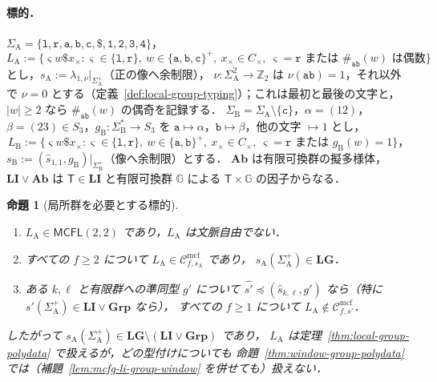 \documentclass[11pt,a4paper]{ltjsarticle}
\numberwithin{equation}{section}
\theoremstyle{plain}
\newtheorem{proposition}[theorem]{命題}
\theoremstyle{definition}
\theoremstyle{remark}
\newcommand{\Cmcf}[2]{\mathcal{C}^{\mathrm{mcf}}_{#1,#2}}
\theoremstyle{plain}
\begin{document}
\paragraph{標的．}
$\Sigma_{\mathrm A}=\{\mathtt l,\mathtt r,\mathtt a,\mathtt b,\mathtt c,\mathtt\$,
\mathtt 1,\mathtt 2,\mathtt 3,\mathtt 4\}$，
\[
 L_{\mathrm A}:=\{\varsigma w\mathtt\$x_\times:\varsigma\in\{\mathtt l,\mathtt r\},\
 w\in\{\mathtt a,\mathtt b,\mathtt c\}^+,\ x_\times\in C_\times,\
 \varsigma=\mathtt r\text{ または }\#_{\mathtt{ab}}(w)\text{ は偶数}\}
\]
とし，$s_{\mathrm A}:=\lambda_{1,\nu}|_{\Sigma_{\mathrm A}^+}$（正の像へ余制限），
$\nu:\Sigma_{\mathrm A}^2\to\mathbb Z_2$ は $\nu(\mathtt{ab})=1$，それ以外で $\nu=0$
とする（定義~\ref{def:local-group-typing}）；これは最初と最後の文字と，
$|w|\ge2$ なら $\#_{\mathtt{ab}}(w)$ の偶奇を記録する．
$\Sigma_{\mathrm B}=\Sigma_{\mathrm A}\setminus\{\mathtt c\}$，$\alpha=(12)$，
$\beta=(23)\in S_3$，$g_{\mathrm B}:\Sigma_{\mathrm B}^*\to S_3$ を
$\mathtt a\mapsto\alpha$，$\mathtt b\mapsto\beta$，他の文字 $\mapsto1$ とし，
\[
 L_{\mathrm B}:=\{\varsigma w\mathtt\$x_\times:\varsigma\in\{\mathtt l,\mathtt r\},\
 w\in\{\mathtt a,\mathtt b\}^+,\ x_\times\in C_\times,\
 \varsigma=\mathtt r\text{ または }g_{\mathrm B}(w)=1\}，
\]
$s_{\mathrm B}:=(\widehat s_{1,1},g_{\mathrm B})|_{\Sigma_{\mathrm B}^+}$（像へ余制限）とする．
$\mathbf{Ab}$ は有限可換群の擬多様体，
$\mathbf{LI}\vee\mathbf{Ab}$ は $\mathsf T\in\mathbf{LI}$ と有限可換群 ${\mathbb G}$ による
$\mathsf T\times {\mathbb G}$ の因子からなる．

\begin{proposition}[局所群を必要とする標的]
\label{prop:lg-needed-target}
\begin{enumerate}[label=\textup{(\roman*)},leftmargin=*]
\item $L_{\mathrm A}\in\mathsf{MCFL}(2,2)$ であり，$L_{\mathrm A}$ は文脈自由でない．
\item すべての $f\ge2$ について $L_{\mathrm A}\in\Cmcf{f}{s_{\mathrm A}}$ であり，
$s_{\mathrm A}(\Sigma_{\mathrm A}^+)\in\mathbf{LG}$．
\item ある $k,\ell$ と有限群への準同型 $g'$ について
$\widehat{s'}\preceq(\widehat s_{k,\ell},g')$ なら（特に
$s'(\Sigma_{\mathrm A}^+)\in\mathbf{LI}\vee\mathbf{Grp}$ なら），
すべての $f\ge1$ について $L_{\mathrm A}\notin\Cmcf{f}{s'}$．
\end{enumerate}
したがって $s_{\mathrm A}(\Sigma_{\mathrm A}^+)\in\mathbf{LG}\setminus(\mathbf{LI}\vee\mathbf{Grp})$ であり，
$L_{\mathrm A}$ は定理~\ref{thm:local-group-polydata} で扱えるが，どの型付けについても
命題~\ref{thm:window-group-polydata} では（補題~\ref{lem:mcfg-li-group-window} を併せても）扱えない．
\end{proposition}
\end{document}
